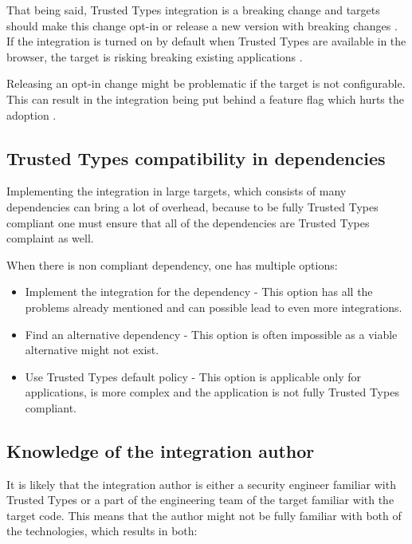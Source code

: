 That being said, Trusted Types integration is a breaking change and targets should make this change
opt-in or release a new version with breaking changes \cite{dom_purify_major_version}. If the
integration is turned on by default when Trusted Types are available in the browser, the target is
risking breaking existing applications \cite{dom_purify_breakage}.

Releasing an opt-in change might be problematic if the target is not configurable. This can result
in the integration being put behind a feature flag which hurts the adoption
\cite{react_tt_feature_flag}.

\subsection{Trusted Types compatibility in dependencies}
\label{sub:tt_compatibility_in_deps}

Implementing the integration in large targets, which consists of many dependencies can bring a lot
of overhead, because to be fully Trusted Types compliant one must ensure that all of the
dependencies are Trusted Types complaint as well.

When there is non compliant dependency, one has multiple options:

\begin{itemize}
  \item Implement the integration for the dependency - This option has all the problems already
        mentioned and can possible lead to even more integrations.
  \item Find an alternative dependency - This option is often impossible as a viable alternative
        might not exist.
  \item Use Trusted Types default policy - This option is applicable only for applications, is more
        complex and the application is not fully Trusted Types compliant.
\end{itemize}

\subsection{Knowledge of the integration author}
\label{sub:trust_integration_author}

It is likely that the integration author is either a security engineer familiar with Trusted Types
or a part of the engineering team of the target familiar with the target code. This means that the
author might not be fully familiar with both of the technologies, which results in both:

